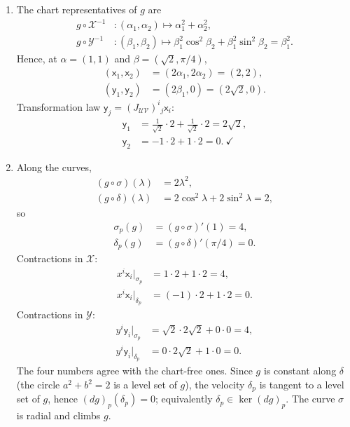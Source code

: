 \documentclass[11pt]{article}
\begin{document}
\begin{enumerate}[label=(\alph*)]
\[\]
two disconnected half-lines in $\mathcal Y(\mathcal V)$. Nevertheless $\sigma$ is smooth: smoothness is tested in a chart that sees the whole curve, and
$\mathcal X\circ\sigma=(\lambda,\lambda)$ is smooth on $\mathbb R$. The gap belongs to the chart $\mathcal Y$, not to the curve.
\item The chart representatives of $g$ are
\begin{align*}
g\circ\mathcal X^{-1}&:(\alpha_1,\alpha_2)\mapsto\alpha_1^2+\alpha_2^2,\\
g\circ\mathcal Y^{-1}&:(\beta_1,\beta_2)\mapsto\beta_1^2\cos^2\beta_2+\beta_1^2\sin^2\beta_2=\beta_1^2.
\end{align*}
Hence, at $\alpha=(1,1)$ and $\beta=(\sqrt2,\pi/4)$,
\begin{align*}
(\mathsf x_1,\mathsf x_2)&=(2\alpha_1,2\alpha_2)=(2,2),\\
(\mathsf y_1,\mathsf y_2)&=(2\beta_1,0)=(2\sqrt2,0).
\end{align*}
Transformation law $\mathsf y_j=(J_{\mathcal{UV}})^i{}_j\mathsf x_i$:
\begin{align*}
\mathsf y_1&=\tfrac1{\sqrt2}\cdot2+\tfrac1{\sqrt2}\cdot2=2\sqrt2,\\
\mathsf y_2&=-1\cdot2+1\cdot2=0.\ \checkmark
\end{align*}
\item Along the curves,
\begin{align*}
(g\circ\sigma)(\lambda)&=2\lambda^2,\\
(g\circ\delta)(\lambda)&=2\cos^2\lambda+2\sin^2\lambda=2,
\end{align*}
so
\begin{align*}
\sigma_p(g)&=(g\circ\sigma)'(1)=4,\\
\delta_p(g)&=(g\circ\delta)'(\pi/4)=0.
\end{align*}
Contractions in $\mathcal X$:
\begin{align*}
x^i\mathsf x_i\big|_{\sigma_p}&=1\cdot2+1\cdot2=4,\\
x^i\mathsf x_i\big|_{\delta_p}&=(-1)\cdot2+1\cdot2=0.
\end{align*}
Contractions in $\mathcal Y$:
\begin{align*}
y^i\mathsf y_i\big|_{\sigma_p}&=\sqrt2\cdot2\sqrt2+0\cdot0=4,\\
y^i\mathsf y_i\big|_{\delta_p}&=0\cdot2\sqrt2+1\cdot0=0.
\end{align*}
The four numbers agree with the chart-free ones. Since $g$ is constant along $\delta$ (the circle $a^2+b^2=2$ is a level set of $g$), the velocity
$\delta_p$ is tangent to a level set of $g$, hence $(dg)_p(\delta_p)=0$; equivalently $\delta_p\in\ker(dg)_p$. The curve $\sigma$ is radial and climbs $g$.
\end{enumerate}
\end{document}
